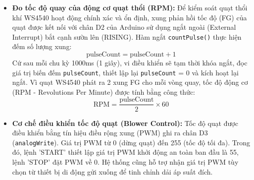 \documentclass[12pt,a4paper]{article}
\begin{document}
\begin{itemize}
    Tương tự, đối với cảm biến lưu lượng kỹ thuật số Sensirion SFM3300-D, công thức chuyển đổi từ giá trị thô 14-bit đọc qua I2C (\texttt{Raw\_Flow}) sang giá trị lưu lượng thực tế (slm) là:
    \begin{equation}
        \text{Flow (slm)} = \frac{\text{Raw\_Flow} - 32768}{120.0}
    \end{equation}
    Công thức này hoàn toàn chính xác theo datasheet của nhà sản xuất Sensirion với giá trị điểm không  = 32768 và hệ số tỉ lệ  = 120 $\text{slm}^{-1}$.

    \item \textbf{Đo tốc độ quay của động cơ quạt thổi (RPM):}
    Để kiểm soát quạt thổi khí WS4540 hoạt động chính xác và ổn định, xung phản hồi tốc độ (FG) của quạt được kết nối với chân D2 của Arduino sử dụng ngắt ngoài (External Interrupt) bắt cạnh sườn lên (RISING). Hàm ngắt \texttt{countPulse()} thực hiện đếm số lượng xung:
    \begin{equation}
        \text{pulseCount} = \text{pulseCount} + 1
    \end{equation}
    Cứ sau mỗi chu kỳ 1000ms (1 giây), vi điều khiển sẽ tạm thời khóa ngắt, đọc giá trị biến đếm \texttt{pulseCount}, thiết lập lại \texttt{pulseCount} = 0 và kích hoạt lại ngắt. Vì quạt WS4540 phát ra 2 xung FG cho mỗi vòng quay, tốc độ động cơ (RPM - Revolutions Per Minute) được tính bằng công thức:
    \begin{equation}
        \text{RPM} = \frac{\text{pulseCount}}{2} \times 60
    \end{equation}

    \item \textbf{Cơ chế điều khiển tốc độ quạt (Blower Control):}
    Tốc độ quạt được điều khiển bằng tín hiệu điều rộng xung (PWM) ghi ra chân D3 (\texttt{analogWrite}). Giá trị PWM từ 0 (dừng quạt) đến 255 (tốc độ tối đa). Trong đó, lệnh 'START' thiết lập giá trị PWM khởi động an toàn ban đầu là 55, lệnh 'STOP' đặt PWM về 0. Hệ thống cũng hỗ trợ nhận giá trị PWM tùy chọn từ thiết bị di động gửi xuống để tinh chỉnh dải áp suất đích.


\end{itemize}
\end{document}
